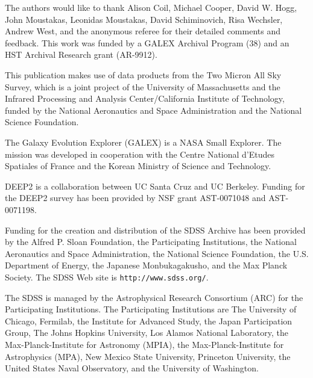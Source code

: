 \documentclass[12pt,preprint]{aastex}
\begin{document}

\acknowledgments

The authors would like to thank Alison Coil, Michael Cooper, David
W. Hogg, John Moustakas, Leonidas Moustakas, David Schiminovich, Risa
Wechsler, Andrew West, and the anonymous referee for their detailed comments and
feedback. This work was funded by a GALEX Archival Program (38) and an
HST Archival Research grant (AR-9912).

This publication makes use of data products from the Two Micron All
Sky Survey, which is a joint project of the University of
Massachusetts and the Infrared Processing and Analysis
Center/California Institute of Technology, funded by the National
Aeronautics and Space Administration and the National Science
Foundation.

The Galaxy Evolution Explorer (GALEX) is a NASA Small Explorer. The
mission was developed in cooperation with the Centre National d'Etudes
Spatiales of France and the Korean Ministry of Science and Technology.

DEEP2 is a collaboration between UC Santa Cruz and UC Berkeley.
Funding for the DEEP2 survey has been provided by NSF grant
AST-0071048 and AST-0071198.

Funding for the creation and distribution of the SDSS Archive has been
provided by the Alfred P. Sloan Foundation, the Participating
Institutions, the National Aeronautics and Space Administration, the
National Science Foundation, the U.S. Department of Energy, the
Japanese Monbukagakusho, and the Max Planck Society. The SDSS Web site
is {\tt http://www.sdss.org/}.

The SDSS is managed by the Astrophysical Research Consortium (ARC) for
the Participating Institutions. The Participating Institutions are The
University of Chicago, Fermilab, the Institute for Advanced Study, the
Japan Participation Group, The Johns Hopkins University, Los Alamos
National Laboratory, the Max-Planck-Institute for Astronomy (MPIA),
the Max-Planck-Institute for Astrophysics (MPA), New Mexico State
University, Princeton University, the United States Naval Observatory,
and the University of Washington.
 
\end{document}
